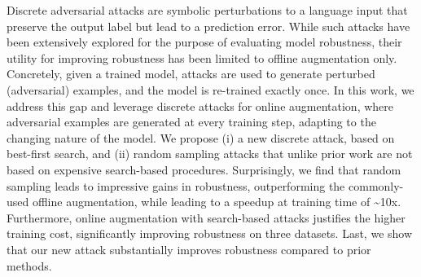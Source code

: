 Discrete adversarial attacks are symbolic perturbations to a language input that preserve the output label but lead to a prediction error. While such attacks have been extensively explored for the purpose of evaluating model robustness, their utility for improving robustness has been limited to offline augmentation only. Concretely, given a trained model, attacks are used to generate perturbed (adversarial) examples, and the model is re-trained exactly once. In this work, we address this gap and leverage discrete attacks for online augmentation, where adversarial examples are generated at every training step, adapting to the changing nature of the model. We propose (i) a new discrete attack, based on best-first search, and (ii) random sampling attacks that unlike prior work are not based on expensive search-based procedures. Surprisingly, we find that random sampling leads to impressive gains in robustness, outperforming the commonly-used offline augmentation, while leading to a speedup at training time of {\textasciitilde}10x. Furthermore, online augmentation with search-based attacks justifies the higher training cost, significantly improving robustness on three datasets. Last, we show that our new attack substantially improves robustness compared to prior methods.
